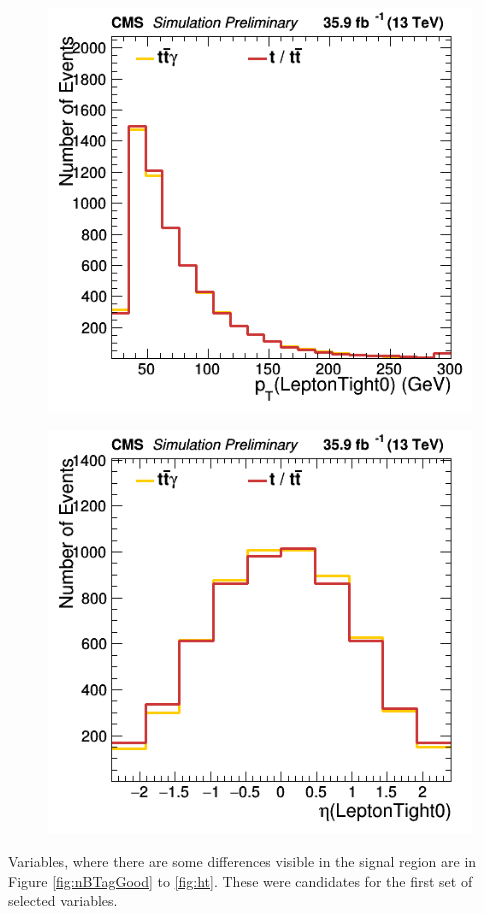 \documentclass[11pt]{scrartcl}
\begin{document}
\begin{figure}[H]
\centering
\begin{minipage}{.5\textwidth}
  \centering
  \includegraphics[width=0.75\linewidth]{figures/Notused/LeptonTight0_pt.png}
  \label{fig:LeptonTight0pt}
\end{minipage}%
\begin{minipage}{.5\textwidth}
  \centering
  \includegraphics[width=0.75\linewidth]{figures/Notused/LeptonTight0_eta.png}
  \label{fig:LeptonTight0eta}
\end{minipage}
\end{figure}

Variables, where there are some differences visible in the signal region are in Figure \ref{fig:nBTagGood} to \ref{fig:ht}. These were candidates for the first set of selected variables. 
\end{document}
